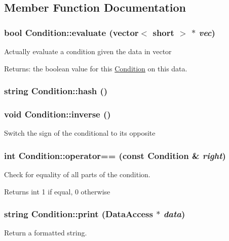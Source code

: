 \subsection{Member Function Documentation}
\hypertarget{classCondition_a332c47202b299556963b3a68b050d3b9}{
\subsubsection[{evaluate}]{\setlength{\rightskip}{0pt plus 5cm}bool Condition::evaluate (vector$<$ short $>$ $\ast$ {\em vec})}}
\label{classCondition_a332c47202b299556963b3a68b050d3b9}
Actually evaluate a condition given the data in vector

Returns: the boolean value for this \hyperlink{classCondition}{Condition} on this data. \hypertarget{classCondition_a2139d8d1ae38b2ca9dfea947b3f6f858}{
\subsubsection[{hash}]{\setlength{\rightskip}{0pt plus 5cm}string Condition::hash ()}}
\label{classCondition_a2139d8d1ae38b2ca9dfea947b3f6f858}
\hypertarget{classCondition_a6f95eacf1437f7800ebf81c89a6cf6c0}{
\subsubsection[{inverse}]{\setlength{\rightskip}{0pt plus 5cm}void Condition::inverse ()}}
\label{classCondition_a6f95eacf1437f7800ebf81c89a6cf6c0}
Switch the sign of the conditional to its opposite \hypertarget{classCondition_ad4c38e1ab62b02a54cec27b36d957c21}{
\subsubsection[{operator==}]{\setlength{\rightskip}{0pt plus 5cm}int Condition::operator== (const {\bf Condition} \& {\em right})}}
\label{classCondition_ad4c38e1ab62b02a54cec27b36d957c21}
Check for equality of all parts of the condition.

\begin{DoxyReturn}{Returns}
int 1 if equal, 0 otherwise 
\end{DoxyReturn}
\hypertarget{classCondition_a00c6f9ba842c26e21bba25848f2b0404}{
\subsubsection[{print}]{\setlength{\rightskip}{0pt plus 5cm}string Condition::print ({\bf DataAccess} $\ast$ {\em data})}}
\label{classCondition_a00c6f9ba842c26e21bba25848f2b0404}
Return a formatted string.

